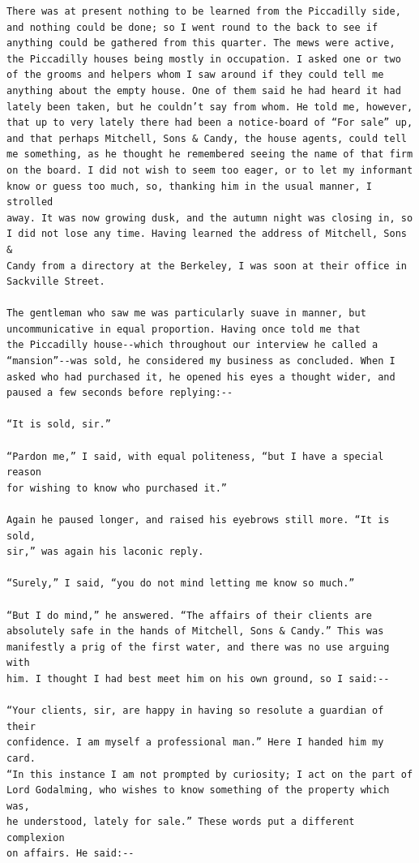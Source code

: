 \documentclass{article}
\begin{document}
\begin{verbatim}
There was at present nothing to be learned from the Piccadilly side,
and nothing could be done; so I went round to the back to see if
anything could be gathered from this quarter. The mews were active,
the Piccadilly houses being mostly in occupation. I asked one or two
of the grooms and helpers whom I saw around if they could tell me
anything about the empty house. One of them said he had heard it had
lately been taken, but he couldn’t say from whom. He told me, however,
that up to very lately there had been a notice-board of “For sale” up,
and that perhaps Mitchell, Sons & Candy, the house agents, could tell
me something, as he thought he remembered seeing the name of that firm
on the board. I did not wish to seem too eager, or to let my informant
know or guess too much, so, thanking him in the usual manner, I strolled
away. It was now growing dusk, and the autumn night was closing in, so
I did not lose any time. Having learned the address of Mitchell, Sons &
Candy from a directory at the Berkeley, I was soon at their office in
Sackville Street.

The gentleman who saw me was particularly suave in manner, but
uncommunicative in equal proportion. Having once told me that
the Piccadilly house--which throughout our interview he called a
“mansion”--was sold, he considered my business as concluded. When I
asked who had purchased it, he opened his eyes a thought wider, and
paused a few seconds before replying:--

“It is sold, sir.”

“Pardon me,” I said, with equal politeness, “but I have a special reason
for wishing to know who purchased it.”

Again he paused longer, and raised his eyebrows still more. “It is sold,
sir,” was again his laconic reply.

“Surely,” I said, “you do not mind letting me know so much.”

“But I do mind,” he answered. “The affairs of their clients are
absolutely safe in the hands of Mitchell, Sons & Candy.” This was
manifestly a prig of the first water, and there was no use arguing with
him. I thought I had best meet him on his own ground, so I said:--

“Your clients, sir, are happy in having so resolute a guardian of their
confidence. I am myself a professional man.” Here I handed him my card.
“In this instance I am not prompted by curiosity; I act on the part of
Lord Godalming, who wishes to know something of the property which was,
he understood, lately for sale.” These words put a different complexion
on affairs. He said:--


\end{verbatim}
\end{document}
